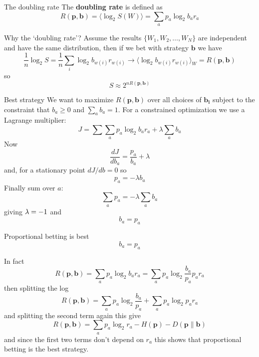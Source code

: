 \documentclass{beamer}
\newcommand{\crish}{\color{reddish}}
\newcommand{\cbla}{\color{black}}
\newcommand{\cblu}{\color{blue}}
\begin{document}
\begin{frame}{The doubling rate}
  The \textbf{doubling rate} is defined as
  \crish
  $$
  R(\mathbf{p},\mathbf{b})=\langle \log_2{S(W)}\rangle= \sum_a{p_a\log_2{b_ar_a}}
  $$
  \cbla
\end{frame}

\begin{frame}{Why the `doubling rate'?}
  Assume the results \crish$\{W_1,W_2,\ldots,W_N\}$\cbla{} are independent and have the same distribution, then if we bet with strategy \crish$\mathbf{b}$\cbla{} we have
  \crish
  $$ \frac{1}{n}\log_2{S}=\frac{1}{n}\sum_i \log_2{b_{w(i)}r_{w(i)}}\rightarrow \langle \log_2{b_{w(i)}r_{w(i)}}\rangle_W= R(\mathbf{p},\mathbf{b})$$
  \cbla
  so\cblu
  $$
  S\approx 2^{nR(\mathbf{p},\mathbf{b})}
  $$\cbla
\end{frame}

\begin{frame}{Best strategy}
  We want to maximize \crish$R(\mathbf{p},\mathbf{b})$\cbla{} over all choices of \crish$\mathbf{b_i}$\cbla{} subject to the constraint that \crish$b_a\ge0$\cbla{} and \crish$\sum_ab_a=1$\cbla{}. For a constrained optimization we use a Lagrange multiplier:
  \crish $$
  J=\sum \sum_a{p_a\log_2{b_ar_a}} +\lambda \sum_ab_a
  $$\cbla
  Now
  \crish $$
  \frac{dJ}{db_a}=\frac{p_a}{b_a}+\lambda
  $$\cbla
  and, for a stationary point \crish$dJ/db=0$\cbla{} so
    \crish $$
  p_a=-\lambda b_a
  $$\cbla
  Finally sum over \crish$a$\cbla{}:
    \crish $$
  \sum_a p_a = -\lambda \sum_a b_a
  $$\cbla
  giving \crish $\lambda=-1\cbla{}$\cbla{} and
  \crish $$
  b_a=p_a
  $$\cbla
\end{frame}

\begin{frame}{Proportional betting is best}
  \crish $$
  b_a=p_a
  $$\cbla
\end{frame}

\begin{frame}{In fact}
  \crish
  $$
  R(\mathbf{p},\mathbf{b})= \sum_a{p_a\log_2{b_ar_a}}=\sum_a{p_a\log_2{\frac{b_a}{p_a}p_ar_a}}
  $$
  \cbla  
  then splitting the log
  \crish
  $$
  R(\mathbf{p},\mathbf{b})=\sum_ap_a\log_2{\frac{b_a}{p_a}}+\sum_ap_a\log_2{p_ar_a}
  $$
    \cbla
    and splitting the second term again this give
    \crish
    $$
      R(\mathbf{p},\mathbf{b})=\sum_ap_a\log_2{r_a}-H(\mathbf{p})-D(\textbf{p}\|\textbf{b})
      $$\cbla
and since the first two terms don't depend on \crish$r_a$\cbla{} this shows that proportional betting is the best strategy. 
\end{frame}
\end{document}
